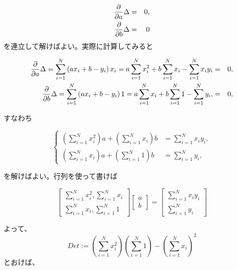 \documentclass[12pt]{jsarticle}
\def\sumdata{\sum_{i=1}^{N}}
\begin{document}
\begin{eqnarray*}
  \frac{\partial }{\partial a} \Delta &=& 0, \\
  \frac{\partial }{\partial b} \Delta &=& 0
\end{eqnarray*}
を連立して解けばよい。実際に計算してみると

\begin{eqnarray*}
  \partd{}{a} \Delta = \sumdata \left(
  a x_i + b - y_i \right) x_i
  = a \sumdata x_i^2 +b \sumdata x_i - \sumdata x_i y_i
  &=& 0, \\
  \partd{}{b} \Delta = \sumdata \left(
  a x_i + b - y_i \right) 1
  = a \sumdata x_i + b \sumdata 1 - \sumdata y_i, &=& 0,
\end{eqnarray*}

すなわち

\begin{equation}
  \left\{
  \begin{array}{ll}
    \left( \sumdata x_i^2 \right) a + \left( \sumdata x_i \right) b
    &= \sumdata x_i y_i, \\
    \left( \sumdata x_i \right) a + \left( \sumdata 1 \right) b
    &= \sumdata y_i,
  \end{array}
  \right.
\end{equation}

を解けばよい。行列を使って書けば

\begin{equation}
  \begin{bmatrix}
    \sumdata x_i^2, \sumdata x_i \\
    \sumdata x_i, \sumdata 1
  \end{bmatrix}
  \begin{bmatrix}
    a \\
    b
  \end{bmatrix}
  =
  \begin{bmatrix}
    \sumdata x_i y_i \\
    \sumdata y_i
  \end{bmatrix}
\end{equation}

よって、
\begin{equation}
  Det := \left( \sumdata x_i^2 \right) \left( \sumdata 1 \right)
  - \left( \sumdata x_i \right)^2
\end{equation}
とおけば、
\end{document}
